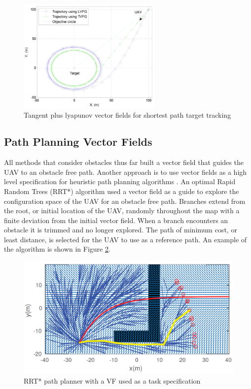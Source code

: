 \documentclass[numbered,pdftex]{ohio-etd}
\begin{document}
\begin{figure}
	\centering
	\includegraphics[width=7cm]{PaperFigures/lyapunovChen}
	\caption{Tangent plus lyapunov vector fields for shortest path target tracking \cite{chen_uav_2013}}
	\label{fig:lyapunovChen}
\end{figure}


\subsection{Path Planning Vector Fields}
All methods that consider obstacles thus far built a vector field that guides the UAV to an obstacle free path. Another approach is to use vector fields as a high level specification for heuristic path planning algorithms \cite{pereira_framework_2016}. An optimal Rapid Random Trees (RRT*) algorithm used a vector field as a guide to explore the configuration space of the UAV for an obstacle free path. Branches extend from the root, or initial location of the UAV, randomly throughout the map with a finite deviation from the initial vector field. When a branch encounters an obstacle it is trimmed and no longer explored. The path of minimum cost, or least distance, is selected for the UAV to use as a reference path. An example of the algorithm is shown in Figure \ref{fig:rrtvf}.

\begin{figure}[H]
	\centering
	\includegraphics[width=12cm]{PaperFigures/rrtVF}
	\caption{RRT* path planner with a VF used as a task specification \cite{pereira_framework_2016}}
	\label{fig:rrtvf}
\end{figure}
\end{document}
